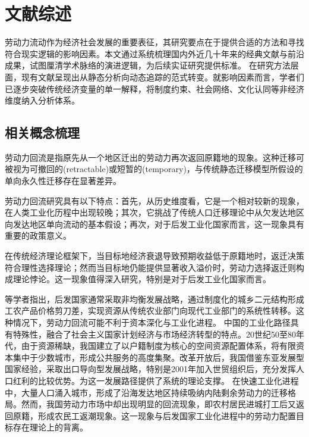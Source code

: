 \documentclass[a4paper, zihao=-4, fontset = mac, oneside]{ctexbook} %
\begin{document}
\frontmatter

\mainmatter
\chapter*{文献综述}

劳动力流动作为经济社会发展的重要表征，其研究要点在于提供合适的方法和寻找符合现实逻辑的影响因素。本文通过系统梳理国内外近几十年来的经典文献与前沿成果，试图厘清学术脉络的演进逻辑，为后续实证研究提供标准。
在研究方法层面，现有文献呈现出从静态分析向动态追踪的范式转变。就影响因素而言，学者们已逐步突破传统经济变量的单一解释，将制度约束、社会网络、文化认同等非经济维度纳入分析体系。


\section{相关概念梳理}
劳动力回流是指原先从一个地区迁出的劳动力再次返回原籍地的现象。这种迁移可被视为可撤回的(retractable)或短暂的(temporary)，与传统静态迁移模型所假设的单向永久性迁移存在显著差异。

劳动力回流研究具有以下特点：首先，从历史维度看，它是一个相对较新的现象，在人类工业化历程中出现较晚；其次，它挑战了传统人口迁移理论中从欠发达地区向发达地区单向流动的基本假设；再次，对于后发工业化国家而言，这一现象具有重要的政策意义。

在传统经济理论框架下，当目标地经济衰退导致预期收益低于原籍地时，返迁决策符合理性选择理论；然而当目标地仍能提供显著收入溢价时，劳动力选择返迁则构成理论悖论。这一现象值得深入研究，特别是对于后发工业化国家而言。

\textcite{CaiFangHuJiZhiDuYuLaoDongLiShiChangBaoHu2001}等学者指出，后发国家通常采取非均衡发展战略，通过制度化的城乡二元结构形成工农产品价格剪刀差，实现资源从传统农业部门向现代工业部门的系统性转移。这种情况下，劳动力回流可能不利于资本深化与工业化进程。
中国的工业化路径具有特殊性，融合了社会主义国家计划经济与市场经济转型的特点。20世纪50至80年代，由于资源稀缺，我国建立了以户籍制度为核心的空间资源配置体系，将有限资本集中于少数城市，形成公共服务的高度集聚。改革开放后，我国借鉴东亚发展型国家经验，采取出口导向型发展战略，特别是2001年加入世贸组织后，充分发挥人口红利的比较优势。\textcite{LinYiFuZhongGuoDeJingJiFaZhanZhanLueYuDiQuShouRuChaiJu2003}为这一发展路径提供了系统的理论支撑。
在快速工业化进程中，大量人口涌入城市，形成了沿海发达地区持续吸纳内陆剩余劳动力的迁移格局。然而，我国劳动力市场中却出现明显的回流现象，即农村居民进城打工后又返回原籍，形成农民工返潮现象。这一现象与后发国家工业化进程中的劳动力配置目标存在理论上的背离。
\end{document}
